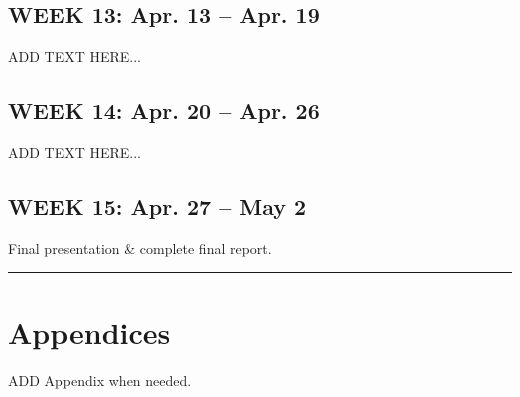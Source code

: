 \documentclass[journal,12pt,onecolumn,draftclsnofoot]{IEEEtran}
\begin{document}
%
\subsection*{WEEK 13: Apr. 13 -- Apr. 19}
ADD TEXT HERE...

%
\subsection*{WEEK 14: Apr. 20 -- Apr. 26}
ADD TEXT HERE...

%
\subsection*{WEEK 15: Apr. 27 -- May 2}
Final presentation \& complete final report.


\noindent\rule{8cm}{0.5pt}
\appendix
\section{Appendices}
ADD Appendix when needed.



\end{document}
